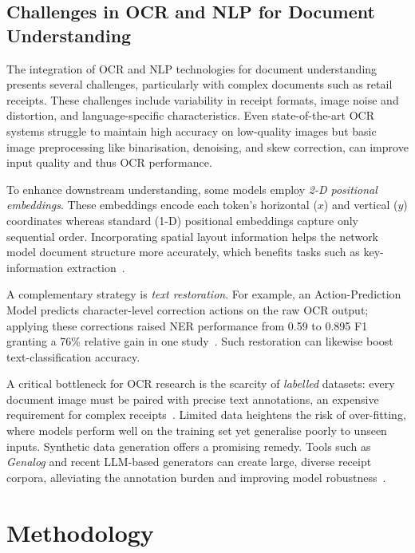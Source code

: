 \documentclass{SGGW-thesis-EN}
\begin{document}
\section{Challenges in OCR and NLP for Document Understanding}

The integration of OCR and NLP technologies for document understanding presents several
challenges, particularly with complex documents such as retail receipts.
These challenges include variability in receipt formats, image noise and distortion, and
language-specific characteristics.
Even state-of-the-art OCR systems struggle to maintain high accuracy on low-quality images but
basic image preprocessing like binarisation, denoising, and skew correction, can improve
input quality and thus OCR performance.

To enhance downstream understanding, some models employ \emph{2-D positional embeddings}.
These embeddings encode each token’s horizontal (\(x\)) and vertical (\(y\)) coordinates
whereas standard (1-D) positional embeddings capture only sequential order.
Incorporating spatial layout information helps the network model document structure more
accurately, which benefits tasks such as key-information extraction~\cite{subramani2021surveydeeplearningapproaches}.

A complementary strategy is \emph{text restoration}.
For example, an Action-Prediction Model predicts character-level correction actions on the
raw OCR output; applying these corrections raised NER performance from 0.59 to 0.895 F1 granting
a 76\% relative gain in one study~\cite{gupte2021lightscameraactionframework}.
Such restoration can likewise boost text-classification accuracy.

A critical bottleneck for OCR research is the scarcity of \emph{labelled} datasets: every
document image must be paired with precise text annotations, an expensive requirement for
complex receipts~\cite{subramani2021surveydeeplearningapproaches}.
Limited data heightens the risk of over-fitting, where models perform well on the training
set yet generalise poorly to unseen inputs.
Synthetic data generation offers a promising remedy.
Tools such as \textit{Genalog} and recent LLM-based generators can create large, diverse
receipt corpora, alleviating the annotation burden and improving model robustness~\cite{gupte2021lightscameraactionframework}.


\chapter{Methodology}
\end{document}
